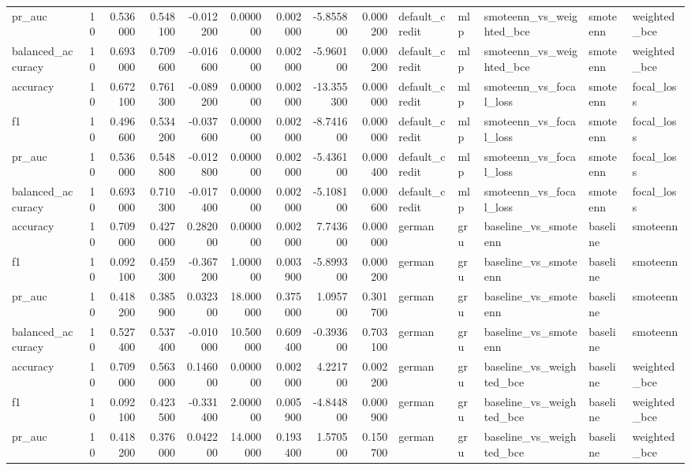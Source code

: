 \begin{tabular}{lrrrrrrrrlllll}
pr_auc & 10 & 0.536000 & 0.548100 & -0.012200 & 0.000000 & 0.002000 & -5.855800 & 0.000200 & default_credit & mlp & smoteenn_vs_weighted_bce & smoteenn & weighted_bce \\
balanced_accuracy & 10 & 0.693000 & 0.709600 & -0.016600 & 0.000000 & 0.002000 & -5.960100 & 0.000200 & default_credit & mlp & smoteenn_vs_weighted_bce & smoteenn & weighted_bce \\
accuracy & 10 & 0.672100 & 0.761300 & -0.089200 & 0.000000 & 0.002000 & -13.355300 & 0.000000 & default_credit & mlp & smoteenn_vs_focal_loss & smoteenn & focal_loss \\
f1 & 10 & 0.496600 & 0.534200 & -0.037600 & 0.000000 & 0.002000 & -8.741600 & 0.000000 & default_credit & mlp & smoteenn_vs_focal_loss & smoteenn & focal_loss \\
pr_auc & 10 & 0.536000 & 0.548800 & -0.012800 & 0.000000 & 0.002000 & -5.436100 & 0.000400 & default_credit & mlp & smoteenn_vs_focal_loss & smoteenn & focal_loss \\
balanced_accuracy & 10 & 0.693000 & 0.710300 & -0.017400 & 0.000000 & 0.002000 & -5.108100 & 0.000600 & default_credit & mlp & smoteenn_vs_focal_loss & smoteenn & focal_loss \\
accuracy & 10 & 0.709000 & 0.427000 & 0.282000 & 0.000000 & 0.002000 & 7.743600 & 0.000000 & german & gru & baseline_vs_smoteenn & baseline & smoteenn \\
f1 & 10 & 0.092100 & 0.459300 & -0.367200 & 1.000000 & 0.003900 & -5.899300 & 0.000200 & german & gru & baseline_vs_smoteenn & baseline & smoteenn \\
pr_auc & 10 & 0.418200 & 0.385900 & 0.032300 & 18.000000 & 0.375000 & 1.095700 & 0.301700 & german & gru & baseline_vs_smoteenn & baseline & smoteenn \\
balanced_accuracy & 10 & 0.527400 & 0.537400 & -0.010000 & 10.500000 & 0.609400 & -0.393600 & 0.703100 & german & gru & baseline_vs_smoteenn & baseline & smoteenn \\
accuracy & 10 & 0.709000 & 0.563000 & 0.146000 & 0.000000 & 0.002000 & 4.221700 & 0.002200 & german & gru & baseline_vs_weighted_bce & baseline & weighted_bce \\
f1 & 10 & 0.092100 & 0.423500 & -0.331400 & 2.000000 & 0.005900 & -4.844800 & 0.000900 & german & gru & baseline_vs_weighted_bce & baseline & weighted_bce \\
pr_auc & 10 & 0.418200 & 0.376000 & 0.042200 & 14.000000 & 0.193400 & 1.570500 & 0.150700 & german & gru & baseline_vs_weighted_bce & baseline & weighted_bce \\

\end{tabular}
